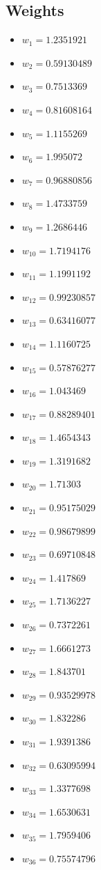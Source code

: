 \documentclass[11pt]{article}
\begin{document}
\subsection*{Weights}
\begin{itemize}
\item $w_{1} = 1.2351921$
\item $w_{2} = 0.59130489$
\item $w_{3} = 0.7513369$
\item $w_{4} = 0.81608164$
\item $w_{5} = 1.1155269$
\item $w_{6} = 1.995072$
\item $w_{7} = 0.96880856$
\item $w_{8} = 1.4733759$
\item $w_{9} = 1.2686446$
\item $w_{10} = 1.7194176$
\item $w_{11} = 1.1991192$
\item $w_{12} = 0.99230857$
\item $w_{13} = 0.63416077$
\item $w_{14} = 1.1160725$
\item $w_{15} = 0.57876277$
\item $w_{16} = 1.043469$
\item $w_{17} = 0.88289401$
\item $w_{18} = 1.4654343$
\item $w_{19} = 1.3191682$
\item $w_{20} = 1.71303$
\item $w_{21} = 0.95175029$
\item $w_{22} = 0.98679899$
\item $w_{23} = 0.69710848$
\item $w_{24} = 1.417869$
\item $w_{25} = 1.7136227$
\item $w_{26} = 0.7372261$
\item $w_{27} = 1.6661273$
\item $w_{28} = 1.843701$
\item $w_{29} = 0.93529978$
\item $w_{30} = 1.832286$
\item $w_{31} = 1.9391386$
\item $w_{32} = 0.63095994$
\item $w_{33} = 1.3377698$
\item $w_{34} = 1.6530631$
\item $w_{35} = 1.7959406$
\item $w_{36} = 0.75574796$

\end{itemize}
\end{document}
